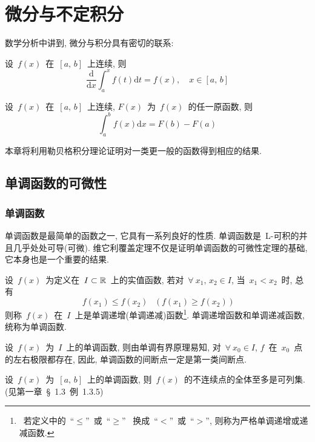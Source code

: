 \chapter{微分与不定积分}

数学分析中讲到, 微分与积分具有密切的联系:

\begin{theorem}[微积分学基本定理]
设~$f(x)$~在~$[a,\,b]$~上连续, 则
\[
\frac{\mathrm{d}}{\mathrm{d} x} \int_a^x f(t) \mathrm{d} t = f(x), \quad x \in [a,\,b]
\]
\end{theorem}

\begin{theorem}
设~$f(x)$~在~$[a,\,b]$~上连续, $F(x)$~为~$f(x)$~的任一原函数, 则
\[
\int_a^b f(x) \mathrm{d} x = F(b)-F(a)
\]
\end{theorem}

本章将利用勒贝格积分理论证明对一类更一般的函数得到相应的结果.

\section{单调函数的可微性}

\subsection{单调函数}

单调函数是最简单的函数之一, 它具有一系列良好的性质. 单调函数是~L-可积的并且几乎处处可导(可微). 维它利覆盖定理不仅是证明单调函数的可微性定理的基础, 它本身也是一个重要的结果.

\begin{definition}
设~$f(x)$~为定义在~$I \subset \mathbb{R}$~上的实值函数, 若对~$\forall~x_1,\,x_2 \in I$, 当~$x_1 < x_2$~时, 总有
\[
f(x_1) \leqslant f(x_2) \quad \big(~f(x_1) \geqslant f(x_2)~\big)
\]
则称~$f(x)$~在~$I$~上是单调递增(单调递减)函数\footnote{~若定义中的~``$\leqslant$''~或~``$\geqslant$''~
换成~``$<$''~或~``$>$'', 则称为严格单调递增或递减函数. }. 单调递增函数和单调递减函数, 统称为单调函数.
\end{definition}

设~$f(x)$~为~$I$~上的单调函数, 则由单调有界原理易知, 对~$\forall~x_0 \in I$, $f$~在~$x_0$~点的左右极限都存在, 因此, 单调函数的间断点一定是第一类间断点.

\begin{theorem} \label{thm511}
设~$f(x)$~为~$[a,\,b]$~上的单调函数, 则~$f(x)$~的不连续点的全体至多是可列集.
(见第一章~\S~1.3~例~1.3.5)
\end{theorem}

